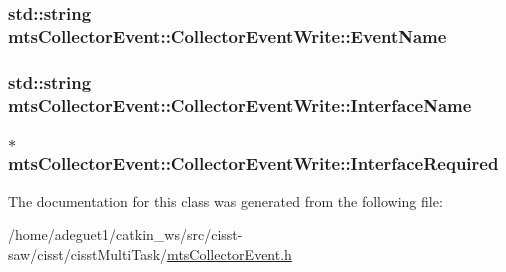 \hypertarget{classmts_collector_event_1_1_collector_event_write_aa32519e39892386c15043154c5872ea5}{
\subsubsection[{Event\-Name}]{\setlength{\rightskip}{0pt plus 5cm}std\-::string mts\-Collector\-Event\-::\-Collector\-Event\-Write\-::\-Event\-Name}}\label{classmts_collector_event_1_1_collector_event_write_aa32519e39892386c15043154c5872ea5}
\hypertarget{classmts_collector_event_1_1_collector_event_write_a7f50054b5709dc9d12b073b45193c0c1}{
\subsubsection[{Interface\-Name}]{\setlength{\rightskip}{0pt plus 5cm}std\-::string mts\-Collector\-Event\-::\-Collector\-Event\-Write\-::\-Interface\-Name}}\label{classmts_collector_event_1_1_collector_event_write_a7f50054b5709dc9d12b073b45193c0c1}
\hypertarget{classmts_collector_event_1_1_collector_event_write_a4b474bb7e7316260c530ba3b496c78c3}{
\subsubsection[{Interface\-Required}]{$\ast$ mts\-Collector\-Event\-::\-Collector\-Event\-Write\-::\-Interface\-Required}}\label{classmts_collector_event_1_1_collector_event_write_a4b474bb7e7316260c530ba3b496c78c3}


The documentation for this class was generated from the following file\-:\begin{DoxyCompactItemize}
\item 
/home/adeguet1/catkin\-\_\-ws/src/cisst-\/saw/cisst/cisst\-Multi\-Task/\hyperlink{mts_collector_event_8h}{mts\-Collector\-Event.\-h}\end{DoxyCompactItemize}
